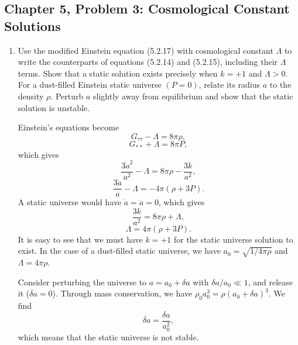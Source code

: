 \subsection{Chapter 5, Problem 3: Cosmological Constant Solutions}

\begin{enumerate}[label=\alph*)]
    \item Use the modified Einstein equation (5.2.17) with cosmological constant
    $\Lambda$ to write the counterparts of equations (5.2.14) and (5.2.15),
    including their $\Lambda$ terms. Show that a static solution exists precisely
    when $k=+1$ and $\Lambda>0$. For a dust-filled Einstein static universe
    $(P=0)$, relate its radius $a$ to the density $\rho$. Perturb $a$ slightly
    away from equilibrium and show that the static solution is unstable.
    \begin{solution}
        Einstein's equations become
        \begin{equation}
            G_{\tau\tau} -\Lambda = 8\pi \rho,
        \end{equation}
        \begin{equation}
            G_{**} + \Lambda = 8\pi P,
        \end{equation}
        which gives
        \begin{equation}
            \frac{3\dot a ^2}{a^2} -\Lambda = 8\pi \rho - \frac{3k}{a^2},
        \end{equation}
        \begin{equation}
            \frac{3\ddot a}{a} - \Lambda= -4\pi(\rho+3P).
        \end{equation}
        A static universe would have $\dot a = \ddot a = 0$, which gives
        \begin{equation}
            \frac{3k}{a^2} = 8\pi \rho + \Lambda,
        \end{equation}
        \begin{equation}
            \Lambda = 4\pi(\rho+3P).
        \end{equation}
        It is easy to see that we must have $k = +1$ for the static universe solution to exist. In the case of a dust-filled static universe, we have $a_0 = \sqrt{1/4\pi\rho}$ and $\Lambda = 4\pi \rho$.

        Consider perturbing the universe to $a = a_0 + \delta a$ with $\delta a / a_0 \ll 1$, and release it ($\dot{\delta a} = 0$). Through mass conservation, we have $\rho_0a_0^3 = \rho(a_0 + \delta a)^3$. We find
        \begin{equation}
            \ddot{\delta a} = \frac{\delta a}{a_0^2},
        \end{equation}
        which means that the static universe is not stable.
    \end{solution}


\end{enumerate}
